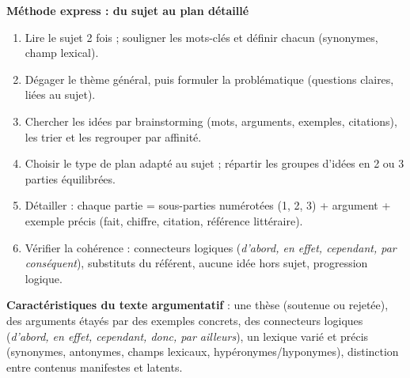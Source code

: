 \documentclass[11pt]{article}
\begin{document}
\begin{bilan}
\textbf{Méthode express : du sujet au plan détaillé}
\begin{enumerate}
  \item Lire le sujet 2 fois ; souligner les mots-clés et définir chacun (synonymes, champ lexical).
  \item Dégager le thème général, puis formuler la problématique (questions claires, liées au sujet).
  \item Chercher les idées par brainstorming (mots, arguments, exemples, citations), les trier et les regrouper par affinité.
  \item Choisir le type de plan adapté au sujet ; répartir les groupes d'idées en 2 ou 3 parties équilibrées.
  \item Détailler : chaque partie = sous-parties numérotées (1, 2, 3) + argument + exemple précis (fait, chiffre, citation, référence littéraire).
  \item Vérifier la cohérence : connecteurs logiques (\emph{d'abord, en effet, cependant, par conséquent}), substituts du référent, aucune idée hors sujet, progression logique.
\end{enumerate}

\textbf{Caractéristiques du texte argumentatif} : une thèse (soutenue ou rejetée), des arguments étayés par des exemples concrets, des connecteurs logiques (\emph{d'abord, en effet, cependant, donc, par ailleurs}), un lexique varié et précis (synonymes, antonymes, champs lexicaux, hypéronymes/hyponymes), distinction entre contenus manifestes et latents.
\end{bilan}
\end{document}
